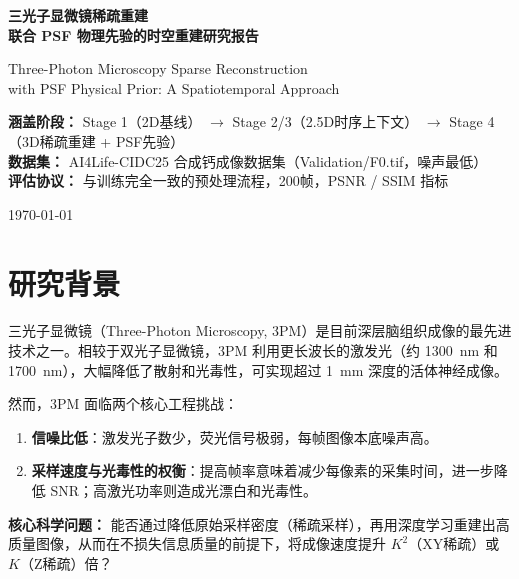 \documentclass[UTF8, scheme=plain, 11pt, a4paper]{ctexart}
\begin{document}
\begin{titlepage}
  \centering
  \vspace*{2cm}
  {\LARGE\bfseries 三光子显微镜稀疏重建\\[0.5em]
   联合 PSF 物理先验的时空重建研究报告\par}
  \vspace{1em}
  {\large Three-Photon Microscopy Sparse Reconstruction\\
   with PSF Physical Prior: A Spatiotemporal Approach\par}
  \vspace{2em}
  {\normalsize
   \textbf{涵盖阶段：} Stage 1（2D基线） $\rightarrow$ Stage 2/3（2.5D时序上下文） $\rightarrow$ Stage 4（3D稀疏重建 + PSF先验）\\[0.5em]
   \textbf{数据集：} AI4Life-CIDC25 合成钙成像数据集（Validation/F0.tif，噪声最低）\\[0.5em]
   \textbf{评估协议：} 与训练完全一致的预处理流程，200帧，PSNR / SSIM 指标\par}
  \vspace{1.5em}
  {\small \today}
  \vfill
\end{titlepage}

\tableofcontents
\newpage

\section{研究背景}

三光子显微镜（Three-Photon Microscopy, 3PM）是目前深层脑组织成像的最先进技术之一。相较于双光子显微镜，3PM 利用更长波长的激发光（约 1300~nm 和 1700~nm），大幅降低了散射和光毒性，可实现超过 1~mm 深度的活体神经成像。

然而，3PM 面临两个核心工程挑战：

\begin{enumerate}[leftmargin=*, label=\textbf{\arabic*.}]
  \item \textbf{信噪比低}：激发光子数少，荧光信号极弱，每帧图像本底噪声高。
  \item \textbf{采样速度与光毒性的权衡}：提高帧率意味着减少每像素的采集时间，进一步降低 SNR；高激光功率则造成光漂白和光毒性。
\end{enumerate}

\noindent\textbf{核心科学问题：}
能否通过降低原始采样密度（稀疏采样），再用深度学习重建出高质量图像，从而在不损失信息质量的前提下，将成像速度提升 $K^2$（XY稀疏）或 $K$（Z稀疏）倍？
\end{document}
